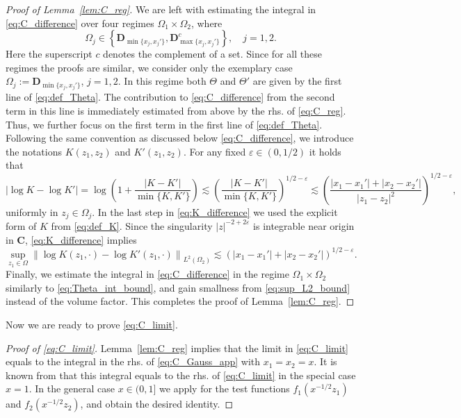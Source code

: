 \documentclass[10pt]{amsart}
\numberwithin{equation}{section}
\newcommand{\C}{\mathbf{C}}
\newcommand{\DD}{\mathbf{D}}
\begin{document}
\begin{proof}[Proof of Lemma~\ref{lem:C_reg}]
We are left with estimating the integral in \eqref{eq:C_difference} over four regimes $\Omega_1\times \Omega_2$, where 
\begin{equation}
\Omega_j\in \left\lbrace \DD_{\min\{x_j,x_j'\}}, \DD_{\max\{x_j,x_j'\}}^c\right\rbrace,\quad j=1,2.
\end{equation}
Here the superscript $c$ denotes the complement of a set. Since for all these regimes the proofs are similar, we consider only the exemplary case $\Omega_j:=\DD_{\min\{x_j,x_j'\}}$, $j=1,2$. In this regime both $\Theta$ and $\Theta'$ are given by the first line of \eqref{eq:def_Theta}. The contribution to \eqref{eq:C_difference} from the second term in this line is immediately estimated from above by the rhs. of \eqref{eq:C_reg}. Thus, we further focus on the first term in the first line of \eqref{eq:def_Theta}. Following the same convention as discussed below \eqref{eq:C_difference}, we introduce the notations $K(z_1,z_2)$ and $K'(z_1,z_2)$. For any fixed $\varepsilon\in (0,1/2)$ it holds that
\begin{equation}
\left\vert\log K - \log K'\right\vert = \log \left(1 + \frac{|K-K'|}{\min\{K,K'\}}\right) \lesssim \left(\frac{|K-K'|}{\min\{K,K'\}}\right)^{1/2-\varepsilon}\!\!\!\!\lesssim \left(\frac{|x_1-x_1'|+|x_2-x_2'|}{|z_1-z_2|^2}\right)^{1/2-\varepsilon}\!\!,
\label{eq:K_difference}
\end{equation}
uniformly in $z_j\in\Omega_j$. In the last step in \eqref{eq:K_difference} we used the explicit form of $K$ from \eqref{eq:def_K}. Since the singularity $|z|^{-2+2\varepsilon}$ is integrable near origin in $\C$, \eqref{eq:K_difference} implies
\begin{equation}
\sup_{z_1\in\Omega}\left\lVert\log K(z_1,\cdot)-\log K'(z_1,\cdot)\right\rVert_{L^2(\Omega_2)}\lesssim \left(|x_1-x_1'|+|x_2-x_2'|\right)^{1/2-\varepsilon}.
\label{eq:sup_L2_bound}
\end{equation}
Finally, we estimate the integral in \eqref{eq:C_difference} in the regime $\Omega_1\times\Omega_2$ similarly to \eqref{eq:Theta_int_bound}, and gain smallness from \eqref{eq:sup_L2_bound} instead of the volume factor. This completes the proof of Lemma~\ref{lem:C_reg}.
\end{proof}

Now we are ready to prove \eqref{eq:C_limit}.

\begin{proof}[Proof of \eqref{eq:C_limit}] Lemma~\ref{lem:C_reg} implies that the limit in \eqref{eq:C_limit} equals to the integral in the rhs. of \eqref{eq:C_Gauss_app} with $x_1=x_2=x$. It is known from \cite[Lemma~4.8]{macroCLT_complex} that this integral equals to the rhs. of \eqref{eq:C_limit} in the special case $x=1$. In the general case $x\in (0,1]$ we apply \cite[Lemma~4.8]{macroCLT_complex} for the test functions $f_1(x^{-1/2}z_1)$ and $f_2(x^{-1/2}z_2)$, and obtain the desired identity.
\end{proof}
\end{document}
